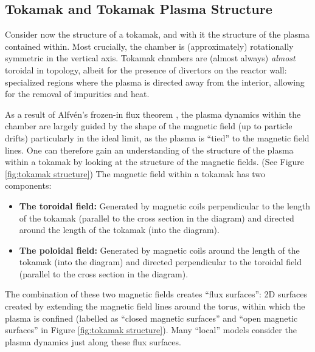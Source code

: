 \subsection*{Tokamak and Tokamak Plasma Structure}
    Consider now the structure of a tokamak, and with it the structure of the plasma contained within. Most crucially, the chamber is (approximately) rotationally symmetric in the vertical axis. Tokamak chambers are (almost always) \emph{almost} toroidal in topology, albeit for the presence of divertors on the reactor wall: specialized regions where the plasma is directed away from the interior, allowing for the removal of impurities and heat.
    
    As a result of Alfvén's frozen-in flux theorem \cite{Alfvén_1943}, the plasma dynamics within the chamber are largely guided by the shape of the magnetic field (up to particle drifts) particularly in the ideal limit, as the plasma is ``tied'' to the magnetic field lines. One can therefore gain an understanding of the structure of the plasma within a tokamak by looking at the structure of the magnetic fields. (See Figure \ref{fig:tokamak structure}) The magnetic field within a tokamak has two components:
    \begin{itemize}
        \item  {\bf The toroidal field:} Generated by magnetic coils perpendicular to the length of the tokamak (parallel to the cross section in the diagram) and directed around the length of the tokamak (into the diagram).
        \item  {\bf The poloidal field:} Generated by magnetic coils around the length of the tokamak (into the diagram) and directed perpendicular to the toroidal field (parallel to the cross section in the diagram).
    \end{itemize}
    The combination of these two magnetic fields creates ``flux surfaces'': 2D surfaces created by extending the magnetic field lines around the torus, within which the plasma is confined (labelled as ``closed magnetic surfaces'' and ``open magnetic surfaces'' in Figure \ref{fig:tokamak structure}). Many ``local'' models consider the plasma dynamics just along these flux surfaces.

